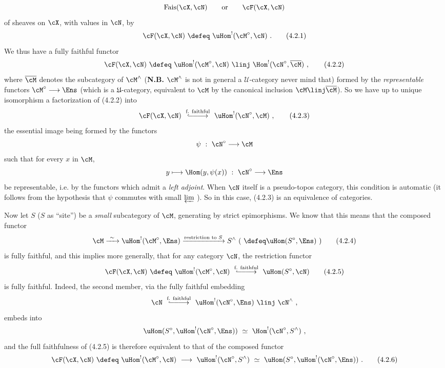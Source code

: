 \[
\mathrm{Fais}(\cX,\cN) \qquad \text{or} \qquad \cF(\cX,\cN)
\]
of sheaves on $\cX$, with values in $\cN$, by
\[
\cF(\cX,\cN) \ \defeq\ \uHom^{!}(\cM^{\circ},\cN) \ .
\tag*{(4.2.1)}
\]
We thus have a fully faithful functor
\[
\cF(\cX,\cN) \ \defeq\ \uHom^{!}(\cM^{\circ},\cN) \ \linj\ \Hom^{!}(\cN^{\circ},\overline{\cM}) \ ,
\tag*{(4.2.2)}
\]
where $\overline{\cM}$ denotes the subcategory of $\cM^{\wedge}$ (\textbf{N.B.} $\cM^{\wedge}$ is not in general a $\mathcal{U}$-category never mind that) formed by the \textit{representable} functors $\cM^{\circ}\longrightarrow\Ens$ (which is a $\mathfrak{U}$-category, equivalent to $\cM$ by the canonical inclusion $\cM \linj \overline{\cM}$). So we have up to unique isomorphism a factorization of (4.2.2) into
\[
\cF(\cX,\cN) \ \overset{\text{f. faithful}}{\lhook\joinrel\relbar\joinrel\relbar\joinrel\longrightarrow}\ \uHom^{!}(\cN^{\circ},\cM) \ ,
\tag*{(4.2.3)}
\]
the essential image being formed by the functors
\[
\psi \ :\ \cN^{\circ} \longrightarrow \cM
\]
such that for every $x$ in $\cM$,
\[
y \longmapsto \Hom(y,\psi(x)) \ :\ \cN^{\circ} \longrightarrow \Ens
\]
be representable, i.e. by the functors which
admit a \textit{left adjoint}. When $\cN$ itself is a pseudo-topos category, this condition is automatic (it follows from the hypothesis that $\psi$ commutes with small $\varprojlim$ ). So in this case, (4.2.3) is an equivalence of categories.

Now let $S$ ($S$ as ``site'') be a \textit{small} subcategory of $\cM$, generating by strict epimorphisms. We know that this means that the composed functor
\[
\cM \xrightarrow{\ \sim\ } \uHom^{!}(\cM^{\circ},\Ens) \xrightarrow{\text{restriction to } S} S^{\wedge} \ (\ \defeq \uHom(S^{\circ},\Ens)\ )
\tag*{(4.2.4)}
\]
is fully faithful, and this implies more generally, that for any category $\cN$, the restriction functor
\[
\cF(\cX,\cN) \ \defeq\ \uHom^{!}(\cM^{\circ},\cN) \ \overset{\text{f. faithful}}{\lhook\joinrel\relbar\joinrel\relbar\joinrel\longrightarrow}\ \uHom(S^{\circ},\cN)
\tag*{(4.2.5)}
\]
is fully faithful. Indeed, the second member, via the fully faithful embedding
\[
\cN \ \overset{\text{f. faithful}}{\lhook\joinrel\relbar\joinrel\relbar\joinrel\longrightarrow}\ \uHom^{!}(\cN^{\circ},\Ens) \ \linj\ \cN^{\wedge} \ ,
\]
embeds into
\[
\uHom(S^{\circ},\uHom^{!}(\cN^{\circ},\Ens)) \ \simeq\ \Hom^{!}(\cN^{\circ},S^{\wedge}) \ ,
\]
and the full faithfulness of (4.2.5) is therefore equivalent to that of the composed functor
\[
\cF(\cX,\cN) \ \defeq\ \uHom^{!}(\cM^{\circ},\cN) \ \longrightarrow\ \uHom^{!}(\cN^{\circ},S^{\wedge}) \ \simeq\ \uHom(S^{\circ},\uHom^{!}(\cN^{\circ},\Ens)) \ .
\tag*{(4.2.6)}
\]

